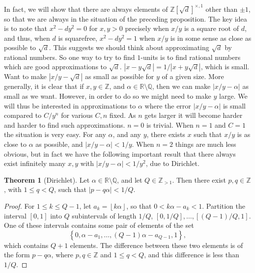 \documentclass{article}
\newcommand{\Z}{\mathbb{Z}}
\newcommand{\Q}{\mathbb{Q}}
\newcommand{\R}{\mathbb{R}}
\newcommand{\rb}[1]{\left( #1 \right)}
\renewcommand{\sb}[1]{\left[ #1 \right]}
\newcommand{\cb}[1]{\left\{ #1 \right\}}
\newcommand{\abs}[1]{\left\lvert #1 \right\rvert}
\theoremstyle{definition}\newtheorem{definition}{Definition}
\theoremstyle{definition}\newtheorem{remark}[definition]{Remark}
\theoremstyle{definition}\newtheorem*{example}{Example}
\theoremstyle{definition}\newtheorem*{note}{Note}
\newtheorem{theorem}[definition]{Theorem}
\begin{document}
In fact, we will show that there are always elements of $ \Z\sb{\sqrt{d}}^{\times, 1} $ other than $ \pm 1 $, so that we are always in the situation of the preceding proposition. The key idea is to note that $ x^2 - dy^2 = 0 $ for $ x, y > 0 $ precisely when $ x / y $ is a square root of $ d $, and thus, when $ d $ is squarefree, $ x^2 - dy^2 = 1 $ when $ x / y $ is in some sense as close as possible to $ \sqrt{d} $. This suggests we should think about approximating $ \sqrt{d} $ by rational numbers. So one way to try to find $ 1 $-units is to find rational numbers which are good approximations to $ \sqrt{d} $. $ \abs{x - y\sqrt{d}} = 1 / \abs{x + y\sqrt{d}} $, which is small. Want to make $ \abs{x / y - \sqrt{d}} $ as small as possible for $ y $ of a given size. More generally, it is clear that if $ x, y \in \Z $, and $ \alpha \in \R \setminus \Q $, then we can make $ \abs{x / y - \alpha} $ as small as we want. However, in order to do so we might need to make $ y $ large. We will thus be interested in approximations to $ \alpha $ where the error $ \abs{x / y - \alpha} $ is small compared to $ C / y^n $ for various $ C, n $ fixed. As $ n $ gets larger it will become harder and harder to find such approximations. $ n = 0 $ is trivial. When $ n = 1 $ and $ C = 1 $ the situation is very easy. For any $ \alpha $, and any $ y $, there exists $ x $ such that $ x / y $ is as close to $ \alpha $ as possible, and $ \abs{x / y - \alpha} < 1 / y $. When $ n = 2 $ things are much less obvious, but in fact we have the following important result that there always exist infinitely many $ x, y $ with $ \abs{x / y - \alpha} < 1 / y^2 $, due to Dirichlet.

\begin{theorem}[Dirichlet]
\label{thm:65}
Let $ \alpha \in \R \setminus \Q $, and let $ Q \in \Z_{> 1} $. Then there exist $ p, q \in \Z $, with $ 1 \le q < Q $, such that $ \abs{p - q\alpha} < 1 / Q $.
\end{theorem}

\begin{proof}
For $ 1 \le k \le Q - 1 $, let $ a_k = \left\lfloor k\alpha \right\rfloor $, so that $ 0 < k\alpha - a_k < 1 $. Partition the interval $ \sb{0, 1} $ into $ Q $ subintervals of length $ 1 / Q $, $ \sb{0, 1 / Q}, \dots, \sb{\rb{Q - 1} / Q, 1} $. One of these intervals contains some pair of elements of the set
$$ \cb{0, \alpha - a_1, \dots, \rb{Q - 1}\alpha - a_{Q - 1}, 1}, $$
which contains $ Q + 1 $ elements. The difference between these two elements is of the form $ p - q\alpha $, where $ p, q \in \Z $ and $ 1 \le q < Q $, and this difference is less than $ 1 / Q $.
\end{proof}
\end{document}
